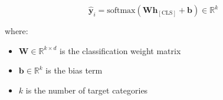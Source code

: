 \documentclass[runningheads]{llncs}
\begin{document}
\begin{equation}\label{eq:classification}
  \hat{\boldsymbol{y}}_i = \text{softmax}(\mathbf{W}\mathbf{h}_{[\text{CLS}]} + \mathbf{b}) \in \mathbb{R}^k
\end{equation}

where:
\begin{itemize}
  \item $\mathbf{W} \in \mathbb{R}^{k \times d}$ is the classification weight matrix
  \item $\mathbf{b} \in \mathbb{R}^k$ is the bias term
  \item $k$ is the number of target categories
\end{itemize}

  




\end{document}
